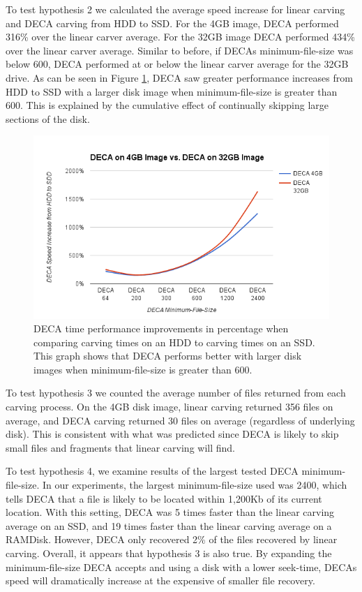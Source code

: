 \documentclass[final,5p,times,twocolumn,authoryear]{elsarticle}
\begin{document}
To test hypothesis 2 we calculated the average speed increase for linear carving and DECA carving from HDD to SSD. For the 4GB image, DECA performed 316\% over the linear carver average. For the 32GB image DECA performed 434\% over the linear carver average. Similar to before, if DECAs minimum-file-size was below 600, DECA performed at or below the linear carver average for the 32GB drive. As can be seen in Figure \ref{fig:4v32}, DECA saw greater performance increases from HDD to SSD with a larger disk image when minimum-file-size is greater than 600. This is explained by the cumulative effect of continually skipping large sections of the disk. 

\begin{figure}
	\includegraphics[width=\textwidth]{figures/4GBv32GB.png}
	\caption{DECA time performance improvements in percentage when comparing carving times on an HDD to carving times on an SSD. This graph shows that DECA performs better with larger disk images when minimum-file-size is greater than 600.}
	\label{fig:4v32}
\end{figure}

To test hypothesis 3 we counted the average number of files returned from each carving process. On the 4GB disk image, linear carving returned 356 files on average, and DECA carving returned 30 files on average (regardless of underlying disk). This is consistent with what was predicted since DECA is likely to skip small files and fragments that linear carving will find.

To test hypothesis 4, we examine results of the largest tested DECA minimum-file-size. In our experiments, the largest minimum-file-size used was 2400, which tells DECA that a file is likely to be located within 1,200Kb of its current location. With this setting, DECA was 5 times faster than the linear carving average on an SSD, and 19 times faster than the linear carving average on a RAMDisk. However, DECA only recovered 2\% of the files recovered by linear carving. Overall, it appears that hypothesis 3 is also true. By expanding the minimum-file-size DECA accepts and using a disk with a lower seek-time, DECAs speed will dramatically increase at the expensive of smaller file recovery.
\end{document}
